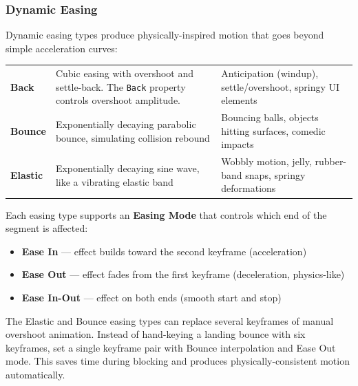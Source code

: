 \subsubsection{Dynamic Easing}

Dynamic easing types produce physically-inspired motion that goes beyond simple acceleration curves:

\begin{center}
\begin{tabularx}{\textwidth}{L{2cm}L{5.5cm}X}
\toprule
{}
 &  &  \\
\midrule
\textbf{Back} & Cubic easing with overshoot and settle-back. The \texttt{Back} property controls overshoot amplitude. & Anticipation (windup), settle/overshoot, springy UI elements \\
\textbf{Bounce} & Exponentially decaying parabolic bounce, simulating collision rebound & Bouncing balls, objects hitting surfaces, comedic impacts \\
\textbf{Elastic} & Exponentially decaying sine wave, like a vibrating elastic band & Wobbly motion, jelly, rubber-band snaps, springy deformations \\
\bottomrule
\end{tabularx}
\end{center}

Each easing type supports an \textbf{Easing Mode} that controls which end of the segment is affected:

\begin{itemize}[leftmargin=2em]
  \item \textbf{Ease In} --- effect builds toward the second keyframe (acceleration)
  \item \textbf{Ease Out} --- effect fades from the first keyframe (deceleration, physics-like)
  \item \textbf{Ease In-Out} --- effect on both ends (smooth start and stop)
\end{itemize}

\begin{tipbox}
The Elastic and Bounce easing types can replace several keyframes of manual overshoot animation. Instead of hand-keying a landing bounce with six keyframes, set a single keyframe pair with Bounce interpolation and Ease Out mode. This saves time during blocking and produces physically-consistent motion automatically.
\end{tipbox}

